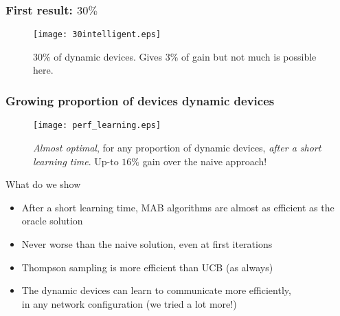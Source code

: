 \subsubsection{First result: $30\%$}

\begin{frameO}

    \begin{figure}[h!]
        \centering
        \texttt{[image: 30intelligent.eps]}

            \begin{small}
                $30\%$ of dynamic devices. Gives $3\%$ of gain but not much is possible here.
            \end{small}
    \end{figure}

\end{frameO}


\subsubsection{Growing proportion of devices dynamic devices}

\begin{frameO}[Dependency on \(D/(S+D)\)]

    \begin{figure}[h!]
        \centering
        \texttt{[image: perf\_learning.eps]}

            \emph{Almost optimal}, for any proportion of dynamic devices, \emph{after a short learning time}. Up-to $16\%$ gain over the naive approach!
    \end{figure}

\end{frameO}


\begin{frameO}

    \begin{colorblock}{What do we show}

        \begin{itemize}
            \setlength\itemsep{10pt}
            \item
                  After a short learning time, MAB algorithms are almost as efficient as
                  the oracle solution
            \item
                  Never worse than the naive solution, even at first iterations
            \item
                  Thompson sampling is more efficient than UCB
                  (as always)
            \item
                  The dynamic devices can learn to communicate more efficiently,\\
                  in any network configuration (we tried a lot more!)
        \end{itemize}

    \end{colorblock}

\end{frameO}


